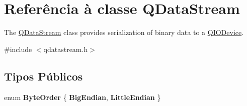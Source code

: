 \hypertarget{class_q_data_stream}{\section{Referência à classe Q\-Data\-Stream}
\label{class_q_data_stream}
}


The \hyperlink{class_q_data_stream}{Q\-Data\-Stream} class provides serialization of binary data to a \hyperlink{class_q_i_o_device}{Q\-I\-O\-Device}.  




{\ttfamily \#include $<$qdatastream.\-h$>$}

\subsection*{Tipos Públicos}
\begin{DoxyCompactItemize}
\item 
enum {\bfseries Byte\-Order} \{ {\bfseries Big\-Endian}, 
{\bfseries Little\-Endian}
 \}
\end{DoxyCompactItemize}

